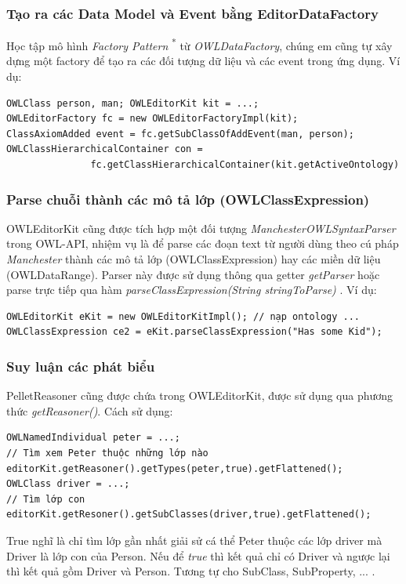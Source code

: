 {\subsubsection{Tạo ra các Data Model và Event bằng EditorDataFactory}
{\let\thefootnote\relax{}
}
Học tập mô hình \textit{Factory Pattern} \textsuperscript{*} từ \textit{OWLDataFactory}, chúng em cũng tự xây dựng một factory để tạo ra các đối tượng dữ liệu và các event trong ứng dụng. Ví dụ:
\begin{verbatim}
OWLClass person, man; OWLEditorKit kit = ...; 
OWLEditorFactory fc = new OWLEditorFactoryImpl(kit);
ClassAxiomAdded event = fc.getSubClassOfAddEvent(man, person);
OWLClassHierarchicalContainer con = 
               fc.getClassHierarchicalContainer(kit.getActiveOntology)
\end{verbatim}

\subsubsection{Parse chuỗi thành các mô tả lớp (OWLClassExpression)}
OWLEditorKit cũng được tích hợp một đối tượng \textit{ManchesterOWLSyntaxParser} trong OWL-API, nhiệm vụ là để parse các đoạn text từ người dùng theo cú pháp \textit{Manchester} thành các mô tả lớp (OWLClassExpression) hay các miền dữ liệu (OWLDataRange). Parser này được sử dụng thông qua getter \textit{getParser} hoặc parse trực tiếp qua hàm \textit{parseClassExpression(String stringToParse)} . Ví dụ:
\begin{verbatim}
OWLEditorKit eKit = new OWLEditorKitImpl(); // nạp ontology ...
OWLClassExpression ce2 = eKit.parseClassExpression("Has some Kid");
\end{verbatim}

\subsubsection{Suy luận các phát biểu}
PelletReasoner cũng được chứa trong OWLEditorKit, được sử dụng qua phương thức \textit{getReasoner()}. Cách sử dụng:
\begin{verbatim}
OWLNamedIndividual peter = ...; 
// Tìm xem Peter thuộc những lớp nào
editorKit.getReasoner().getTypes(peter,true).getFlattened();
OWLClass driver = ...;
// Tìm lớp con 
editorKit.getResoner().getSubClasses(driver,true).getFlattened();
\end{verbatim}
True nghĩ là chỉ tìm lớp gần nhất giải sử cá thể Peter thuộc các lớp driver mà Driver là lớp con của Person. Nếu để \textit{true} thì kết quả chỉ có Driver và ngược lại thì kết quả gồm Driver và Person. Tương tự cho SubClass, SubProperty, ... .
}
